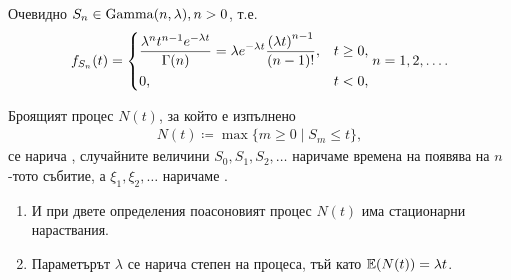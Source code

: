 \documentclass[numbers=endperiod, bibliography=totocnumbered]{scrartcl}
\begin{document}
\begin{definition}
\begin{enumerate}
    Очевидно \( S_n \in \operatorname{Gamma}(n, \lambda), n > 0 \), т.е.
    \begin{align*}
      f_{S_n}(t)
      =
      \begin{dcases}
        \frac {\lambda^n t^{n-1} e^{-\lambda t}} {\Gamma(n)} = \lambda e^{-\lambda t} \frac {{(\lambda t)}^{n-1}} {(n-1)!}, &t \geq 0, \\
        0, &t < 0,
      \end{dcases}
      n = 1, 2, \ldots.
    \end{align*}

    Броящият процес \( N(t) \), за който е изпълнено
    \begin{align*}
      N(t) \coloneqq \max \{ m \geq 0 \mid S_m \leq t \},
    \end{align*}
    се нарича , случайните величини \( S_0, S_1, S_2, \ldots \) наричаме времена на появява на \( n \)-тото събитие, а \( \xi_1, \xi_2, \ldots \) наричаме .
  \end{enumerate}
\end{definition}

\begin{note}
  \mbox{}
  \begin{enumerate}
    \item И при двете определения поасоновият процес \( N(t) \) има стационарни нараствания.
    \item Параметърът \( \lambda \) се нарича степен на процеса, тъй като \( \mathbb{E}(N(t)) = \lambda t \).
  \end{enumerate}
\end{note}
\end{document}
